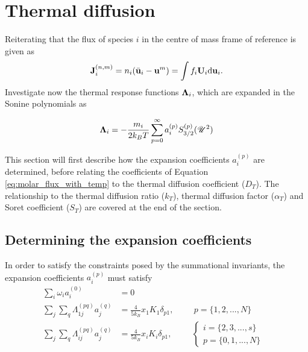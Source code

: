 \section{Thermal diffusion}

Reiterating that the flux of species $i$ in the centre of mass frame of reference is given as
\begin{equation}
    \boldsymbol{\mathrm{J}}^{(n,m)}_i = n_i (\Bar{\boldsymbol{\mathrm{u}}}_i - \boldsymbol{\mathrm{u}}^m) = \int f_i \boldsymbol{\mathrm{U}}_i \mathrm{d} \boldsymbol{\mathrm{u}}_i.
    \label{eq:molar_flux_mass_for2}
\end{equation}
Investigate now the thermal response functions $\boldsymbol{\mathrm{\Lambda}}_i$, which are expanded in the Sonine polynomials as

\begin{equation}
    \boldsymbol{\mathrm{\Lambda}}_i = - \frac{m_i}{2 k_B T} \sum_{p = 0}^{\infty} a_i^{(p)} S_{3/2}^{(p)}(\mathscr{U}^2)
\end{equation}

This section will first describe how the expansion coefficients $a_i^{(p)}$ are determined, before relating the coefficients of Equation \eqref{eq:molar_flux_with_temp} to the thermal diffusion coefficient ($D_T$). The relationship to the thermal diffusion ratio ($k_T$), thermal diffusion factor ($\alpha_T$) and Soret coefficient ($S_T$) are covered at the end of the section.

\subsection{Determining the expansion coefficients}

In order to satisfy the constraints posed by the summational invariants, the expansion coefficients $a_i^{(p)}$ must satisfy
\begin{equation}
    \begin{split}
        \sum_i \omega_i a_i^{(0)} &= 0\\
        \sum_j \sum_q \Lambda_{1j}^{(pq)}a_j^{(q)} &= \frac{4}{5k_B} x_1 K_1 \delta_{p1}, \hspace{1cm} p = \{1, 2, ..., N\} \\
        \sum_j \sum_q \Lambda_{ij}^{(pq)}a_j^{(q)} &= \frac{4}{5k_B} x_i K_i \delta_{p1}, \hspace{1cm} 
        \begin{cases}
            i = \{2, 3, ..., s\} & \\
            p = \{0, 1, ..., N\}
        \end{cases}
    \end{split}
\end{equation}

